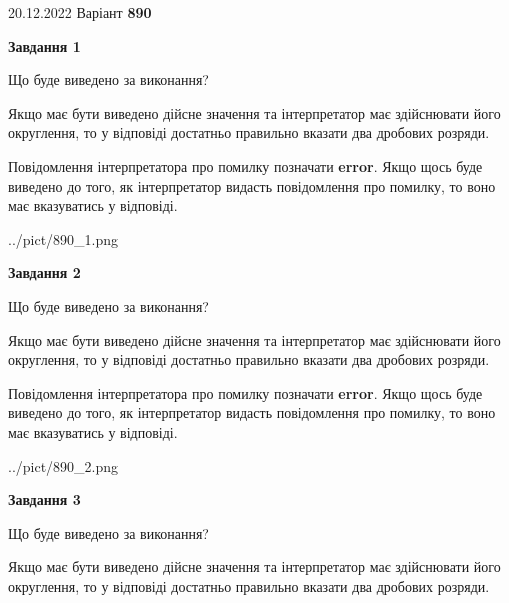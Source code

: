 \documentclass[12pt, ukrainian]{article}
\begin{document}
{20.12.2022 Варіант \No \textbf { 890 }\par}
{
\begin {Large}

{\begin {center}\textbf{Завдання 1}\end {center}}\par
Що буде виведено за виконання? \par

Якщо має бути виведено дійсне значення та інтерпретатор має здійснювати його округлення, 
то у відповіді достатньо правильно вказати два дробових розряди.

Повідомлення інтерпретатора про помилку позначати \textbf{error}.
Якщо щось буде виведено до того, як інтерпретатор видасть повідомлення про помилку, 
то воно має вказуватись у відповіді. \par

\begin{center}
	{../pict/890_1.png}
\end{center}
\newpage

{\begin {center}\textbf{Завдання 2}\end {center}}\par
Що буде виведено за виконання? \par

Якщо має бути виведено дійсне значення та інтерпретатор має здійснювати його округлення, 
то у відповіді достатньо правильно вказати два дробових розряди.

Повідомлення інтерпретатора про помилку позначати \textbf{error}.
Якщо щось буде виведено до того, як інтерпретатор видасть повідомлення про помилку, 
то воно має вказуватись у відповіді. \par

\begin{center}
	{../pict/890_2.png}
\end{center}
\newpage

{\begin {center}\textbf{Завдання 3}\end {center}}\par
Що буде виведено за виконання? \par

Якщо має бути виведено дійсне значення та інтерпретатор має здійснювати його округлення, 
то у відповіді достатньо правильно вказати два дробових розряди.


\end{Large}}
\end{document}
